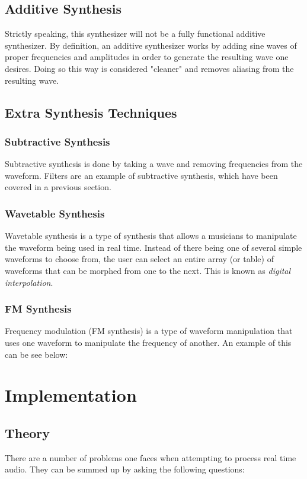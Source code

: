 \documentclass[12pt]{article}
\begin{document}
\subsection{Additive Synthesis}
Strictly speaking, this synthesizer will not be a fully functional additive synthesizer. By definition, an additive synthesizer works by adding sine waves of proper frequencies and amplitudes in order to generate the resulting wave one desires. \cite{Pirkle_2015} Doing so this way is considered "cleaner" and removes aliasing from the resulting wave. 

\subsection{Extra Synthesis Techniques}

\subsubsection*{Subtractive Synthesis}
Subtractive synthesis is done by taking a wave and removing frequencies from the waveform. Filters are an example of subtractive synthesis, which have been covered in a previous section. 

\subsubsection*{Wavetable Synthesis}
Wavetable synthesis is a type of synthesis that allows a musicians to manipulate the waveform being used in real time. Instead of there being one of several simple waveforms to choose from, the user can select an entire array (or table) of waveforms that can be morphed from one to the next. This is known as \textit{digital interpolation}. 

\subsubsection*{FM Synthesis}
Frequency modulation (FM synthesis) is a type of waveform manipulation that uses one waveform to manipulate the frequency of another. An example of this can be see below: 

\newpage
\section{Implementation}

\subsection{Theory}
There are a number of problems one faces when attempting to process real time audio. They can be summed up by asking the following questions:
\end{document}
